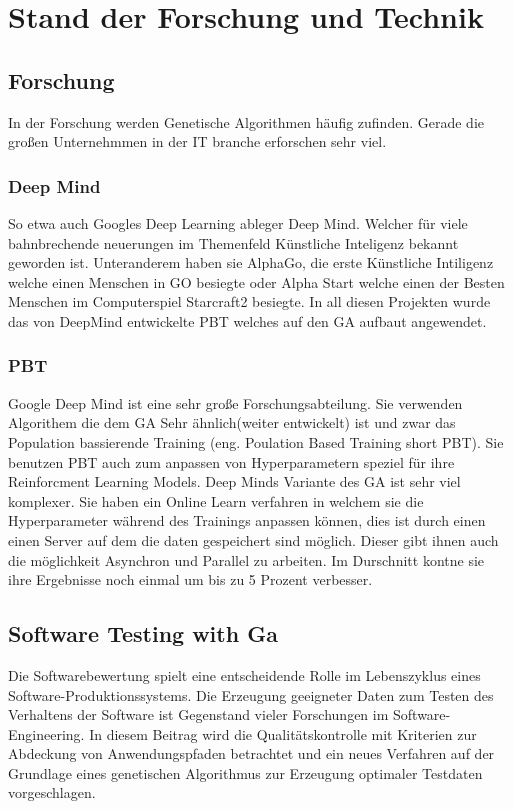 \section{Stand der Forschung und Technik}
\subsection{Forschung}
In der Forschung werden Genetische Algorithmen häufig zufinden. Gerade die großen Unternehmmen in der IT branche erforschen sehr viel.

\subsubsection{Deep Mind}
 So etwa auch Googles Deep Learning ableger Deep Mind. Welcher für viele bahnbrechende neuerungen im Themenfeld Künstliche Inteligenz bekannt geworden ist. Unteranderem haben sie AlphaGo, die erste Künstliche Intiligenz welche einen Menschen in GO besiegte oder Alpha Start welche einen der Besten Menschen im Computerspiel Starcraft2 besiegte. In all diesen Projekten wurde das von DeepMind entwickelte PBT welches auf den GA aufbaut angewendet.
 

\subsubsection{PBT} 
Google Deep Mind ist eine sehr große Forschungsabteilung. 
Sie verwenden Algorithem die dem GA Sehr ähnlich(weiter entwickelt) ist und zwar das Population bassierende Training (eng. Poulation Based Training short PBT). Sie benutzen PBT auch zum anpassen von Hyperparametern speziel für ihre Reinforcment Learning Models. Deep Minds Variante des GA ist sehr viel komplexer. Sie haben ein Online Learn verfahren in welchem sie die Hyperparameter während des Trainings anpassen können, dies ist durch einen einen Server auf dem die daten gespeichert sind möglich. Dieser gibt ihnen auch die möglichkeit Asynchron und Parallel zu arbeiten. Im Durschnitt kontne sie ihre Ergebnisse noch einmal um bis zu 5 Prozent verbesser. 

\subsection{Software Testing with Ga}
Die Softwarebewertung spielt eine entscheidende Rolle im Lebenszyklus eines Software-Produktionssystems. Die Erzeugung geeigneter Daten zum Testen des Verhaltens der Software ist Gegenstand vieler Forschungen im Software-Engineering.  In diesem Beitrag wird die Qualitätskontrolle mit Kriterien zur Abdeckung von Anwendungspfaden betrachtet und ein neues Verfahren auf der Grundlage eines genetischen Algorithmus zur Erzeugung optimaler Testdaten vorgeschlagen. 
\cite{Keshavarz}


